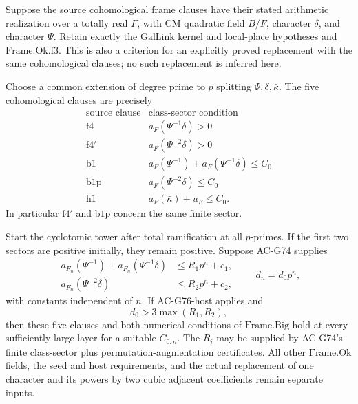 \begin{corollary}
\label{cor:ACG76}
Suppose the source cohomological frame clauses have their stated arithmetic realization over a totally real \(F\), with CM quadratic field \(B/F\), character \(\delta\), and character \(\Psi\). Retain exactly the \(\mathrm{GalLink}\) kernel and local-place hypotheses and \(\mathrm{Frame.Ok.f3}\). This is also a criterion for an explicitly proved replacement with the same cohomological clauses; no such replacement is inferred here.

Choose a common extension of degree prime to \(p\) splitting \(\Psi,\delta,\bar\kappa\). The five cohomological clauses are precisely
\[
\begin{array}{c|c}
 \text{source clause}&\text{class-sector condition}\\ \hline
 \mathrm{f4}&a_F(\Psi^{-1}\delta)>0\\
 \mathrm{f4'}&a_F(\Psi^{-2}\delta)>0\\
 \mathrm{b1}&a_F(\Psi^{-1})+a_F(\Psi^{-1}\delta)\le C_0\\
 \mathrm{b1p}&a_F(\Psi^{-2}\delta)\le C_0\\
 \mathrm{h1}&a_F(\bar\kappa)+u_F\le C_0 .
\end{array}
\tag{G76.7}
\]
In particular \(\mathrm{f4'}\) and \(\mathrm{b1p}\) concern the same finite sector.

Start the cyclotomic tower after total ramification at all \(p\)-primes. If the first two sectors are positive initially, they remain positive. Suppose AC-G74 supplies
\[
 \begin{split}
 a_{F_n}(\Psi^{-1})+a_{F_n}(\Psi^{-1}\delta)&\le R_1p^n+c_1,\\
 a_{F_n}(\Psi^{-2}\delta)&\le R_2p^n+c_2,
 \end{split}
 \qquad d_n=d_0p^n,
 \tag{G76.8}
\]
with constants independent of \(n\). If AC-G76-host applies and
\[
 d_0>3\max(R_1,R_2),
 \tag{G76.9}
\]
then these five clauses and both numerical conditions of \(\mathrm{Frame.Big}\) hold at every sufficiently large layer for a suitable \(C_{0,n}\). The \(R_i\) may be supplied by AC-G74's finite class-sector plus permutation-augmentation certificates. All other \(\mathrm{Frame.Ok}\) fields, the seed and host requirements, and the actual replacement of one character and its powers by two cubic adjacent coefficients remain separate inputs.
\end{corollary}

